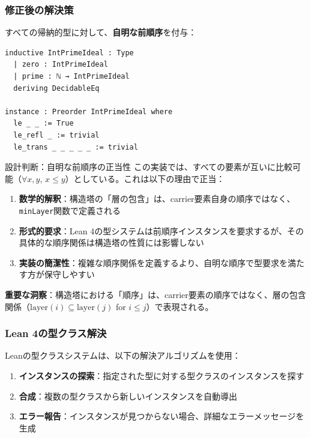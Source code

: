 \documentclass{ltjsarticle}
\begin{document}
\subsubsection{修正後の解決策}

すべての帰納的型に対して、\textbf{自明な前順序}を付与：

\begin{lstlisting}[caption=修正後のコード]
inductive IntPrimeIdeal : Type
  | zero : IntPrimeIdeal
  | prime : ℕ → IntPrimeIdeal
  deriving DecidableEq

instance : Preorder IntPrimeIdeal where
  le _ _ := True
  le_refl _ := trivial
  le_trans _ _ _ _ _ := trivial
\end{lstlisting}

\begin{techbox}{設計判断：自明な前順序の正当性}
この実装では、すべての要素が互いに比較可能（$\forall x, y,\, x \le y$）としている。これは以下の理由で正当：

\begin{enumerate}
\item \textbf{数学的解釈}：構造塔の「層の包含」は、carrier要素自身の順序ではなく、\texttt{minLayer}関数で定義される
\item \textbf{形式的要求}：Lean 4の型システムは前順序インスタンスを要求するが、その具体的な順序関係は構造塔の性質には影響しない
\item \textbf{実装の簡潔性}：複雑な順序関係を定義するより、自明な順序で型要求を満たす方が保守しやすい
\end{enumerate}

\textbf{重要な洞察}：構造塔における「順序」は、carrier要素の順序ではなく、層の包含関係（$\text{layer}(i) \subseteq \text{layer}(j)$ for $i \le j$）で表現される。
\end{techbox}

\subsubsection{Lean 4の型クラス解決}

Leanの型クラスシステムは、以下の解決アルゴリズムを使用：

\begin{enumerate}
\item \textbf{インスタンスの探索}：指定された型に対する型クラスのインスタンスを探す
\item \textbf{合成}：複数の型クラスから新しいインスタンスを自動導出
\item \textbf{エラー報告}：インスタンスが見つからない場合、詳細なエラーメッセージを生成
\end{enumerate}
\end{document}
